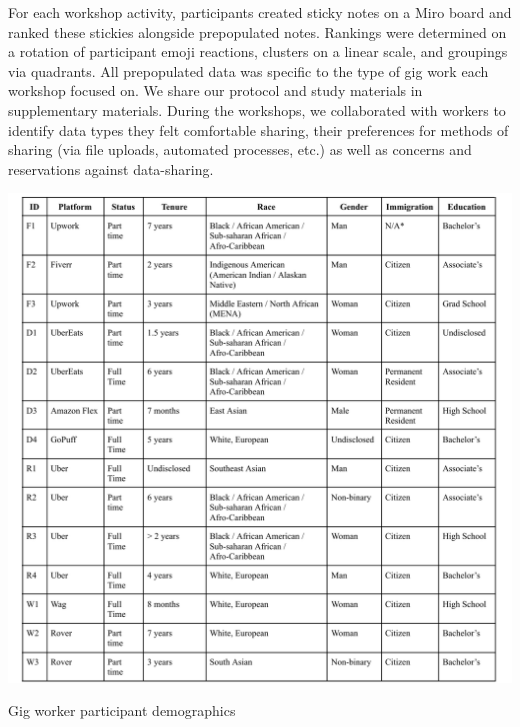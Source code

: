 For each workshop activity, participants created sticky notes on a Miro board and ranked these stickies alongside prepopulated notes. Rankings were determined on a rotation of participant emoji reactions, clusters on a linear scale, and groupings via quadrants. All prepopulated data was specific to the type of gig work each workshop focused on. We share our protocol  and study materials in supplementary materials. During the workshops, we collaborated with workers to identify data types they felt comfortable sharing, their preferences for methods of sharing (via file uploads, automated processes, etc.) as well as concerns and reservations against data-sharing.

\begin{table}[]
  \centering
  \includegraphics[width=\textwidth]{Chapters/images/worker.pdf}
   \caption{Gig worker participant demographics}
  \label{tab:worker}
\end{table}
\FloatBarrier

